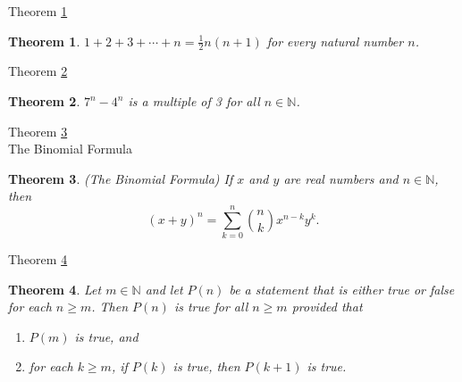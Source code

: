 \documentclass[avery5371,grid]{flashcards}
\newtheorem{theorem}{Theorem}
\newcommand{\bb}[1]{\mathbb{#1}}
\newcommand{\N}{\bb{N}}
\begin{document}
\begin{flashcard}[Theorem]{Theorem \ref{thm21}}
\begin{theorem}
\label{thm21}
$1 + 2 + 3 + \cdots + n = \frac 12 n(n+1)$ for every natural number $n$.
\end{theorem}
\end{flashcard}

\begin{flashcard}[Theorem]{Theorem \ref{thm22}}
\begin{theorem}
\label{thm22}
$7^n - 4^n$ is a multiple of 3 for all $n \in \N$.
\end{theorem}
\end{flashcard}

\begin{flashcard}[Theorem]{Theorem \ref{thm23} \\ The Binomial Formula}
\begin{theorem}
\label{thm23}
(The Binomial Formula)  If $x$ and $y$ are real numbers and $n \in \N$,
then $$(x+y)^n = \sum _{k=0}^n \binom{n}{k} x^{n-k}y^k.$$
\end{theorem}
\end{flashcard}

\begin{flashcard}[Theorem]{Theorem \ref{thm24}}
\begin{theorem}
\label{thm24}
Let $m \in \N$ and let $P(n)$ be a statement that is either true or
false for each $n \geq m$.  Then $P(n)$ is true for all $n \geq m$
provided that
\begin{enumerate}
\item $P(m)$ is true, and
\item for each $k \geq m$, if $P(k)$ is true, then $P(k+1)$ is true.
\end{enumerate}
\end{theorem}
\end{flashcard}
\end{document}
